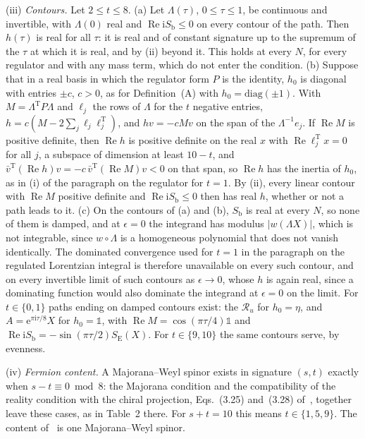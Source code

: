 (iii) \emph{Contours.} Let \(2\le t\le8\). (a) Let \(\Lambda(\tau)\), \(0\le\tau\le1\), be continuous and invertible, with \(\Lambda(0)\) real and \(\operatorname{Re}\mathrm iS_{\mathrm b}\le0\) on every contour of the path. Then \(h(\tau)\) is real for all \(\tau\): it is real and of constant signature up to the supremum of the \(\tau\) at which it is real, and by (ii) beyond it. This holds at every \(N\), for every regulator and with any mass term, which do not enter the condition. (b) Suppose that in a real basis in which the regulator form \(P\) is the identity, \(h_0\) is diagonal with entries \(\pm c\), \(c>0\), as for Definition~(A) with \(h_0=\mathrm{diag}(\pm1)\). With \(M=\Lambda^{\mathrm T}P\Lambda\) and \(\ell_j\) the rows of \(\Lambda\) for the \(t\) negative entries, \(h=c(M-2\sum_j\ell_j\ell_j^{\mathrm T})\), and \(hv=-cMv\) on the span of the \(\Lambda^{-1}e_j\). If \(\operatorname{Re}M\) is positive definite, then \(\operatorname{Re}h\) is positive definite on the real \(x\) with \(\operatorname{Re}\ell_j^{\mathrm T}x=0\) for all \(j\), a subspace of dimension at least \(10-t\), and \(\bar v^{\mathrm T}(\operatorname{Re}h)v=-c\,\bar v^{\mathrm T}(\operatorname{Re}M)v<0\) on that span, so \(\operatorname{Re}h\) has the inertia of \(h_0\), as in (i) of the paragraph on the regulator for \(t=1\). By (ii), every linear contour with \(\operatorname{Re}M\) positive definite and \(\operatorname{Re}\mathrm iS_{\mathrm b}\le0\) then has real \(h\), whether or not a path leads to it. (c) On the contours of (a) and (b), \(S_{\mathrm b}\) is real at every \(N\), so none of them is damped, and at \(\epsilon=0\) the integrand has modulus \(|w(\Lambda X)|\), which is not integrable, since \(w\circ\Lambda\) is a homogeneous polynomial that does not vanish identically. The dominated convergence used for \(t=1\) in the paragraph on the regulated Lorentzian integral is therefore unavailable on every such contour, and on every invertible limit of such contours as \(\epsilon\to0\), whose \(h\) is again real, since a dominating function would also dominate the integrand at \(\epsilon=0\) on the limit. For \(t\in\{0,1\}\) paths ending on damped contours exist: the \(\mathcal R_u\) for \(h_0=\eta\), and \(A=\mathrm e^{\pi\mathrm i\tau/8}X\) for \(h_0=\mathbb 1\), with \(\operatorname{Re}M=\cos(\pi\tau/4)\mathbb 1\) and \(\operatorname{Re}\mathrm iS_{\mathrm b}=-\sin(\pi\tau/2)S_{\mathrm E}(X)\). For \(t\in\{9,10\}\) the same contours serve, by evenness.

(iv) \emph{Fermion content.} A Majorana--Weyl spinor exists in signature \((s,t)\) exactly when \(s-t\equiv0\bmod8\): the Majorana condition and the compatibility of the reality condition with the chiral projection, Eqs.~(3.25) and~(3.28) of~\cite{VanProeyen1999}, together leave these cases, as in Table~2 there. For \(s+t=10\) this means \(t\in\{1,5,9\}\). The content of~\cite{IKKT1997} is one Majorana--Weyl spinor.

